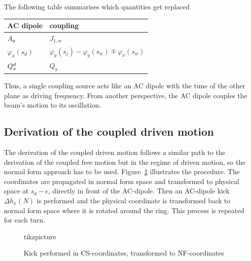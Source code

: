 %
The following table summarises which quantities get replaced
\begin{center}
\begin{tabular}{ll}
    AC dipole & coupling \\
    \hline
    \hline
    $ A_\theta $        & $ J_{1,w} $ \\
    $ \varphi_x(s_d) $  & $ \varphi_y(s_j) - \varphi_y(s_w) \mp \varphi_x(s_w)$ \\
    $ Q^{d}_{x} $          & $ Q_y $\\
    \hline
\end{tabular}
\end{center}
Thus, a single coupling source acts like an AC dipole with the tune of the other plane as driving frequency.
From another perspective, the AC dipole couples the beam's motion to its oscillation.

\subsection{Derivation of the coupled driven motion}

The derivation of the coupled driven motion follows a similar path to the derivation of the 
coupled free motion but in the regime of driven motion, so the normal form approach has to be used.
Figure~\ref{fig_sketch_drv_ac} illustrates the procedure. The coordinates are propagated in normal form
space and transformed to physical space at $s_d-\epsilon$, directly in front of the AC-dipole. Then
an AC-dipole kick $\Delta h_x(N)$ is performed and the physical coordinate is transformed back to
normal form space where it is rotated around the ring. This process is repeated for each turn.

\begin{figure}
  \centering
  tikzpicture
      \caption{Kick performed in CS-coordinates, transformed to NF-coordinates}
  \label{fig_sketch_drv_ac}
\end{figure}

